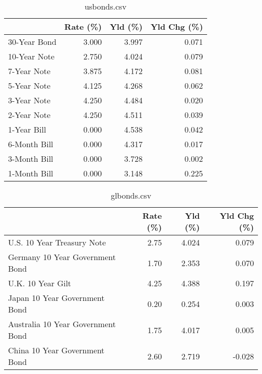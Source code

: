 \documentclass{article}%
\begin{document}
%


\begin{table}[htbp]%
\caption{usbonds.csv}%
\centering%
\begin{adjustbox}{width=1\textwidth}%
\begin{tabular}{lrrr}
\toprule
             &  Rate (\%) &  Yld (\%) &  Yld Chg (\%) \\
\midrule
30-Year Bond &     3.000 &    3.997 &        0.071 \\
10-Year Note &     2.750 &    4.024 &        0.079 \\
 7-Year Note &     3.875 &    4.172 &        0.081 \\
 5-Year Note &     4.125 &    4.268 &        0.062 \\
 3-Year Note &     4.250 &    4.484 &        0.020 \\
 2-Year Note &     4.250 &    4.511 &        0.039 \\
 1-Year Bill &     0.000 &    4.538 &        0.042 \\
6-Month Bill &     0.000 &    4.317 &        0.017 \\
3-Month Bill &     0.000 &    3.728 &        0.002 \\
1-Month Bill &     0.000 &    3.148 &        0.225 \\
\bottomrule
\end{tabular}
%
\end{adjustbox}%
\end{table}

%


\begin{table}[htbp]%
\caption{glbonds.csv}%
\centering%
\begin{adjustbox}{width=1\textwidth}%
\begin{tabular}{lrrr}
\toprule
                                  &  Rate (\%) &  Yld (\%) &  Yld Chg (\%) \\
\midrule
       U.S. 10 Year Treasury Note &      2.75 &    4.024 &        0.079 \\
  Germany 10 Year Government Bond &      1.70 &    2.353 &        0.070 \\
                U.K. 10 Year Gilt &      4.25 &    4.388 &        0.197 \\
    Japan 10 Year Government Bond &      0.20 &    0.254 &        0.003 \\
Australia 10 Year Government Bond &      1.75 &    4.017 &        0.005 \\
    China 10 Year Government Bond &      2.60 &    2.719 &       -0.028 \\
\bottomrule
\end{tabular}
%
\end{adjustbox}%
\end{table}
\end{document}
